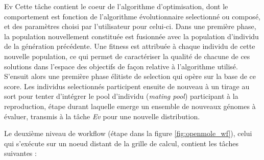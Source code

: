 \begin{myitemize}
\item[Ev] Cette tâche contient le coeur de l'algorithme d'optimisation, dont le comportement est fonction de l'algorithme évolutionnaire selectionné ou composé, et des paramètres choisi par l'utilisateur pour celui-ci. Dans une première phase, la population nouvellement constituée est fusionnée avec la population d'individu de la génération précédente. Une fitness est attribuée à chaque individu de cette nouvelle population, ce qui permet de caractériser la qualité de chacune de ces solutions dans l'espace des objectifs de façon relative à l'algorithme utilisé. S'ensuit alors une première phase élitiste de selection qui opère sur la base de ce score. Les individus selectionnés participent ensuite de nouveau à un tirage au sort pour tenter d'intégrer le pool d'individu (\textit{mating pool}) participant à la reproduction, étape durant laquelle emerge un ensemble de nouveaux génomes à évaluer, transmis à la tâche \textit{Ev} pour une nouvelle distribution.
\end{myitemize}

Le deuxième niveau de workflow (étape  dans la figure \ref{fig:openmole_wf}), celui qui s'exécute sur un noeud distant de la grille de calcul, contient les tâches suivantes :

